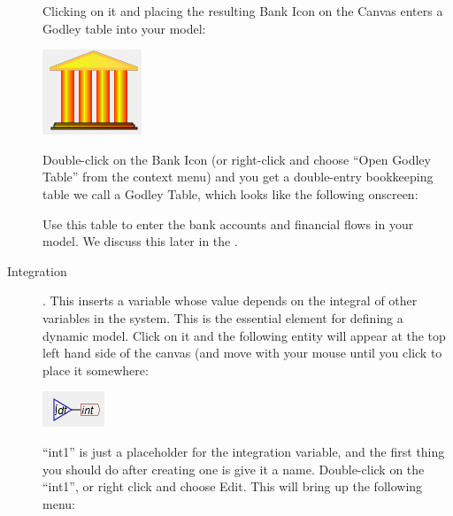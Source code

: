 \begin{description}
Clicking on it and placing the resulting Bank Icon on the Canvas enters
a Godley table into your model:
\begin{center}
\includegraphics{images/NewItem29} 
\par\end{center}

Double-click on the Bank Icon (or right-click and choose ``Open Godley
Table'' from the context menu) and you get a double-entry bookkeeping
table we call a Godley Table, which looks like the following onscreen:


\begin{center}
\par\end{center}

Use this table to enter the bank accounts and financial flows in your
model. We discuss this later in the .
\item [{Integration}] .\label{Integrate} This inserts
a variable whose value depends on the integral of other variables
in the system. This is the essential element for defining a dynamic
model. Click on it and the following entity will appear at the top
left hand side of the canvas (and move with your mouse until you click
to place it somewhere:
\begin{center}
\includegraphics{images/NewItem39} 
\par\end{center}

``int1'' is just a placeholder for the integration variable, and
the first thing you should do after creating one is give it a name.
Double-click on the ``int1'', or right click and choose Edit. This
will bring up the following menu:
\begin{center}
\par\end{center}


\end{description}
